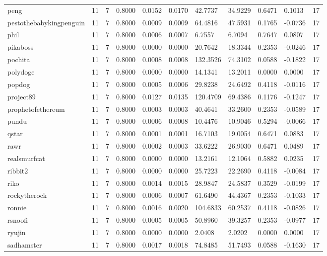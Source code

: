 \begin{table}[htbp]
\begin{tabular}{lllllllllll}
peng & 11 & 7 & 0.8000 & 0.0152 & 0.0170 & 42.7737 & 34.9229 & 0.6471 & 0.1013 & 17 \\
pestothebabykingpenguin & 11 & 7 & 0.8000 & 0.0009 & 0.0009 & 64.4816 & 47.5931 & 0.1765 & -0.0736 & 17 \\
phil & 11 & 7 & 0.8000 & 0.0006 & 0.0007 & 6.7557 & 6.7094 & 0.7647 & 0.0807 & 17 \\
pikaboss & 11 & 7 & 0.8000 & 0.0000 & 0.0000 & 20.7642 & 18.3344 & 0.2353 & -0.0246 & 17 \\
pochita & 11 & 7 & 0.8000 & 0.0008 & 0.0008 & 132.3526 & 74.3102 & 0.0588 & -0.1822 & 17 \\
polydoge & 11 & 7 & 0.8000 & 0.0000 & 0.0000 & 14.1341 & 13.2011 & 0.0000 & 0.0000 & 17 \\
popdog & 11 & 7 & 0.8000 & 0.0005 & 0.0006 & 29.8238 & 24.6492 & 0.4118 & -0.0116 & 17 \\
project89 & 11 & 7 & 0.8000 & 0.0127 & 0.0135 & 120.4709 & 69.4386 & 0.1176 & -0.1247 & 17 \\
prophetofethereum & 11 & 7 & 0.8000 & 0.0003 & 0.0003 & 40.4641 & 33.2600 & 0.2353 & -0.0589 & 17 \\
pundu & 11 & 7 & 0.8000 & 0.0006 & 0.0008 & 10.4476 & 10.9046 & 0.5294 & -0.0066 & 17 \\
qstar & 11 & 7 & 0.8000 & 0.0001 & 0.0001 & 16.7103 & 19.0054 & 0.6471 & 0.0883 & 17 \\
rawr & 11 & 7 & 0.8000 & 0.0002 & 0.0003 & 33.6222 & 26.9030 & 0.6471 & 0.0489 & 17 \\
realsmurfcat & 11 & 7 & 0.8000 & 0.0000 & 0.0000 & 13.2161 & 12.1064 & 0.5882 & 0.0235 & 17 \\
ribbit2 & 11 & 7 & 0.8000 & 0.0000 & 0.0000 & 25.7223 & 22.2690 & 0.4118 & -0.0084 & 17 \\
riko & 11 & 7 & 0.8000 & 0.0014 & 0.0015 & 28.9847 & 24.5837 & 0.3529 & -0.0199 & 17 \\
rockytherock & 11 & 7 & 0.8000 & 0.0006 & 0.0007 & 61.6490 & 44.4367 & 0.2353 & -0.1033 & 17 \\
ronnie & 11 & 7 & 0.8000 & 0.0016 & 0.0020 & 104.6833 & 60.2537 & 0.4118 & -0.0826 & 17 \\
rsnoofi & 11 & 7 & 0.8000 & 0.0005 & 0.0005 & 50.8960 & 39.3257 & 0.2353 & -0.0977 & 17 \\
ryujin & 11 & 7 & 0.8000 & 0.0000 & 0.0000 & 2.0408 & 2.0202 & 0.0000 & 0.0000 & 17 \\
sadhamster & 11 & 7 & 0.8000 & 0.0017 & 0.0018 & 74.8485 & 51.7493 & 0.0588 & -0.1630 & 17 \\

\end{tabular}
\end{table}
